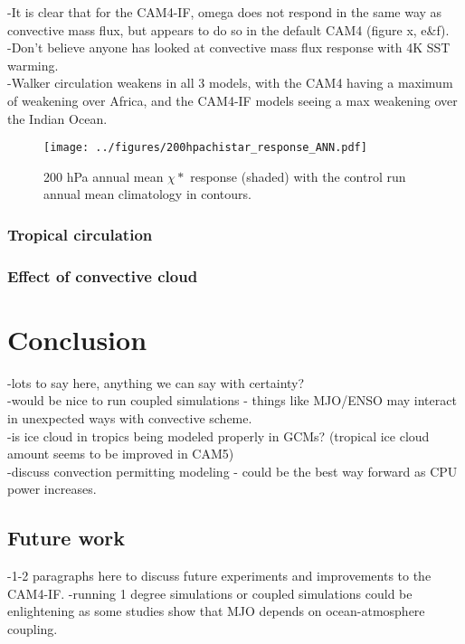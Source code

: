\documentclass[letterpaper,12pt,titlepage,oneside,final]{book}
\begin{document}
-It is clear that for the CAM4-IF, omega does not respond in the same way as convective mass flux, but appears to do so in the default CAM4 (figure x, e\&f).
\\
-Don't believe anyone has looked at convective mass flux response with 4K SST warming.
\\
-Walker circulation weakens in all 3 models, with the CAM4 having a maximum of weakening over Africa, and the CAM4-IF models seeing a max weakening over the Indian Ocean. 
\begin{figure}[H]
\centering
\noindent\texttt{[image: ../figures/200hpachistar\_response\_ANN.pdf]}\hfill
\caption{200 hPa annual mean $\chi*$ response (shaded) with the control run annual mean climatology in contours.}
\end{figure}

\subsection{Tropical circulation}

\subsection{Effect of convective cloud}



\chapter{Conclusion}
-lots to say here, anything we can say with certainty?
\\
-would be nice to run coupled simulations - things like MJO/ENSO may interact in unexpected ways with convective scheme.
\\
-is ice cloud in tropics being modeled properly in GCMs? (tropical ice cloud amount seems to be improved in CAM5)
\\
-discuss convection permitting modeling - could be the best way forward as CPU power increases.
\\
\section{Future work}
-1-2 paragraphs here to discuss future experiments and improvements to the CAM4-IF.
-running 1 degree simulations or coupled simulations could be enlightening as some studies show that MJO depends on ocean-atmosphere coupling.

\end{document}
